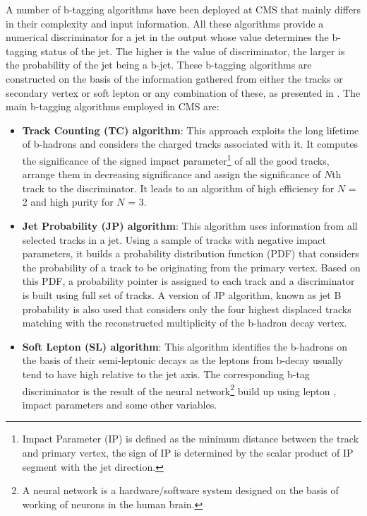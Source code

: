 A number of b-tagging algorithms have been deployed at CMS that mainly differs in their complexity and input information. All these algorithms provide a numerical
discriminator for a jet in the output whose value determines the b-tagging status of the jet. The higher is the value of discriminator, the larger is the probability of
the jet being a b-jet. These b-tagging algorithms are constructed on the basis of the information gathered from either the tracks or secondary vertex or soft lepton or
any combination of these, as presented in \fig{\ref{fig:bjetAlgo}}.
The main b-tagging algorithms employed in CMS are:
\begin{itemize}[leftmargin=*]
\item {\bf{Track Counting (TC) algorithm}}: This approach exploits the long lifetime of b-hadrons and considers the charged tracks associated with it.
  It computes the significance of the signed impact parameter\footnote{Impact Parameter (IP) is defined as the minimum distance between the track and primary vertex, the
    sign of IP is determined by the scalar product of IP segment with the jet direction.} of all the good tracks, arrange them in decreasing significance and assign the
  significance of $N$th track to the discriminator. It leads to an algorithm of high efficiency for $N$ = 2 and high purity for $N$ = 3. 
\item {\bf{Jet Probability (JP) algorithm}}: This algorithm uses information from all selected tracks in a jet. Using a sample of tracks with
  negative impact parameters, it builds a probability distribution
  function (PDF) that considers the probability of a track to be originating from the primary vertex. Based on this PDF, a probability pointer is assigned to each
  track and a discriminator is built using full set of tracks. A version of JP algorithm, known as jet B probability is also used that considers only the four
  highest displaced tracks matching with the reconstructed multiplicity of the b-hadron decay vertex. 
\item {\bf{Soft Lepton (SL) algorithm}}: This algorithm identifies the b-hadrons on the basis of their semi-leptonic decays as the leptons from b-decay usually tend
  to have high \pt relative to the jet axis. The corresponding b-tag discriminator is the result of the neural network\footnote{A neural network
    is a hardware$/$software system designed on the basis of working of neurons in the human brain.} build up using lepton \pt, impact parameters
  and some other variables.

\end{itemize}

